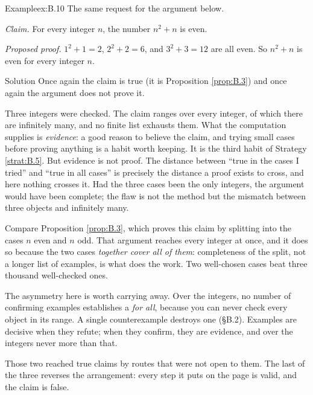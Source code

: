 \documentclass[a4paper,12pt,oneside]{memoir}
\begin{document}
\begin{workedexample}
\begin{envexample}{Example}{ex:B.10}{}
The same request for the argument below.

\emph{Claim.} For every integer \(n\), the number \(n^{2} + n\) is even.

\emph{Proposed proof.} \(1^{2} + 1 = 2\), \(2^{2} + 2 = 6\), and \(3^{2} + 3 = 12\) are all even. So \(n^{2} + n\) is even for every integer \(n\).
\end{envexample}
\begin{envsolution}{Solution}{}{}
Once again the claim is true (it is Proposition \ref{prop:B.3}) and once again the argument does not prove it.

Three integers were checked. The claim ranges over every integer, of which there are infinitely many, and no finite list exhausts them. What the computation supplies is \emph{evidence}: a good reason to believe the claim, and trying small cases before proving anything is a habit worth keeping. It is the third habit of Strategy \ref{strat:B.5}. But evidence is not proof. The distance between “true in the cases I tried” and “true in all cases” is precisely the distance a proof exists to cross, and here nothing crosses it. Had the three cases been the only integers, the argument would have been complete; the flaw is not the method but the mismatch between three objects and infinitely many.

Compare Proposition \ref{prop:B.3}, which proves this claim by splitting into the cases \(n\) even and \(n\) odd. That argument reaches every integer at once, and it does so because the two cases \emph{together cover all of them}: completeness of the split, not a longer list of examples, is what does the work. Two well-chosen cases beat three thousand well-checked ones.

The asymmetry here is worth carrying away. Over the integers, no number of confirming examples establishes a \emph{for all}, because you can never check every object in its range. A single counterexample destroys one (§B.2). Examples are decisive when they refute; when they confirm, they are evidence, and over the integers never more than that.
\end{envsolution}
\end{workedexample}
Those two reached true claims by routes that were not open to them. The last of the three reverses the arrangement: every step it puts on the page is valid, and the claim is false.
\end{document}
